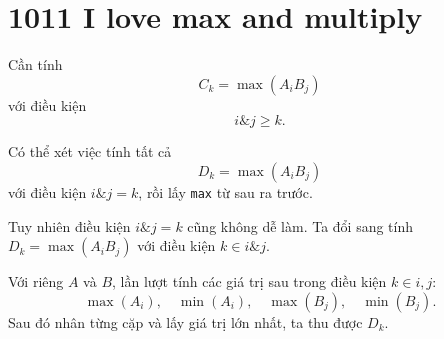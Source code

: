\documentclass[11pt]{article}
\begin{document}
\section{1011 I love max and multiply}

Cần tính
\[
  C_k=\max(A_iB_j)
\]
với điều kiện
\[
  i\mathbin{\&}j \ge k.
\]

Có thể xét việc tính tất cả
\[
  D_k=\max(A_iB_j)
\]
với điều kiện $i\mathbin{\&}j=k$, rồi lấy \texttt{max} từ sau ra trước.

Tuy nhiên điều kiện $i\mathbin{\&}j=k$ cũng không dễ làm. Ta đổi sang tính
$D_k=\max(A_iB_j)$ với điều kiện $k\in i\mathbin{\&}j$.

Với riêng $A$ và $B$, lần lượt tính các giá trị sau trong điều kiện
$k\in i,j$:
\[
  \max(A_i),\quad \min(A_i),\quad \max(B_j),\quad \min(B_j).
\]
Sau đó nhân từng cặp và lấy giá trị lớn nhất, ta thu được $D_k$.
\end{document}
